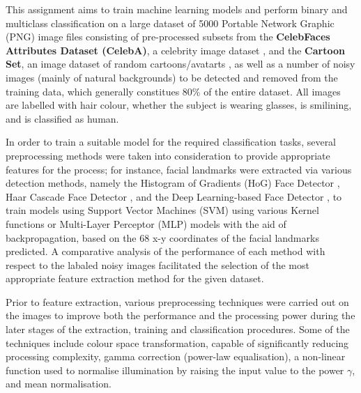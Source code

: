 \documentclass[conference]{IEEEtran}
\begin{document}
This assignment aims to train machine learning models and perform binary and multiclass classification on a large dataset of 5000 Portable Network Graphic (PNG) image files consisting of pre-processed subsets from the \textbf{CelebFaces Attributes Dataset (CelebA)}, a celebrity image dataset  %
, and the \textbf{Cartoon Set}, an image dataset of random cartoons/avatarts %
, as well as a number of noisy images (mainly of natural backgrounds) to be detected and removed from the training data, which generally constitues 80\% of the entire dataset.
All images are labelled with hair colour, whether the subject is wearing glasses, is smilining, and is classified as human.

In order to train a suitable model for the required classification tasks, several preprocessing methods were taken into consideration to provide appropriate features for the process; for instance, facial landmarks were extracted via various detection methods, %
namely the Histogram of Gradients (HoG) Face Detector%
, Haar Cascade Face Detector%
, and the Deep Learning-based Face Detector%
, to train models using Support Vector Machines (SVM) using various Kernel functions or Multi-Layer Perceptor (MLP) models with the aid of backpropagation, based on the 68 x-y coordinates of the facial landmarks predicted.
A comparative analysis of the performance of each method with respect to the labaled noisy images %
facilitated the selection of the most appropriate feature extraction method for the given dataset.

Prior to feature extraction, various preprocessing techniques were carried out on the images to improve both the performance and the processing power during the later stages of the extraction, training and classification procedures. 
Some of the techniques include colour space transformation, capable of significantly reducing processing complexity, gamma correction (power-law equalisation), a non-linear function used to normalise illumination by raising the input value to the power $\gamma$, and mean normalisation.%
\end{document}
